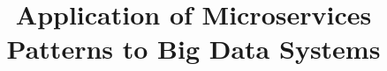 \documentclass{bmcart}
\begin{document}
\begin{frontmatter}

\begin{fmbox}


\title{Application of Microservices Patterns to Big Data Systems}


\author[
  addressref={aff1},                   %
  corref={aff1},                       %
  email={jane.e.doe@cambridge.co.uk}   %
]{ }
\author[
  addressref={aff1,aff2},
  email={john.RS.Smith@cambridge.co.uk}
]{ }


\address[id=aff1]{%
  ,             %
  ,          %
  ,                              %
}
\address[id=aff2]{%
  ,
  ,
  ,
}


\end{fmbox}
\end{frontmatter}
\end{document}
